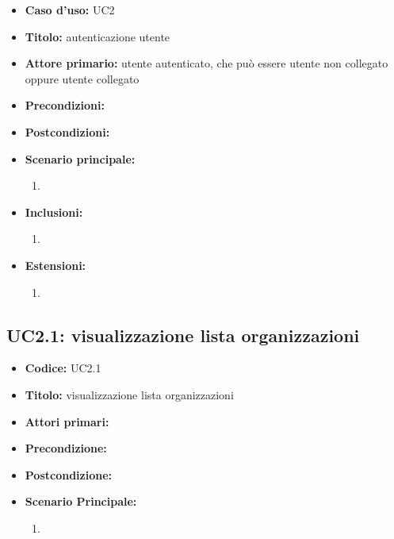 ﻿\documentclass[../analisi-dei-requisiti]{subfiles}
\begin{document}
\begin{itemize}
  \item \textbf{Caso d’uso:} UC2
  \item \textbf{Titolo:} autenticazione utente
  \item \textbf{Attore primario:} utente autenticato, che può essere utente non collegato oppure utente collegato
  \item \textbf{Precondizioni:} 
  \item \textbf{Postcondizioni:} 
  \item \textbf{Scenario principale:} 
  \begin{enumerate}
    \item
  \end{enumerate}
  \item \textbf{Inclusioni:}
  \begin{enumerate}
    \item
  \end{enumerate}
  \item \textbf{Estensioni:} 
  \begin{enumerate}
    \item
  \end{enumerate}
\end{itemize}

\subsection{UC2.1: visualizzazione lista organizzazioni}
\label{sub:uc2.1utente}
\begin{itemize}
  \item \textbf{Codice:} UC2.1
  \item \textbf{Titolo:} visualizzazione lista organizzazioni
  \item \textbf{Attori primari:}
  \item \textbf{Precondizione:}
  \item \textbf{Postcondizione:}
  \item \textbf{Scenario Principale:}
  \begin{enumerate}
    \item
  \end{enumerate}
\end{itemize}
\end{document}
